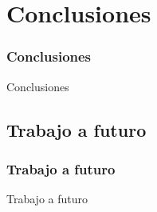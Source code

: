 \section{Conclusiones} %

\begin{frame}
\frametitle{Conclusiones}
Conclusiones
\end{frame}

\subsection{Trabajo a futuro}
\begin{frame}
\frametitle{Trabajo a futuro}
Trabajo a futuro
\end{frame}
